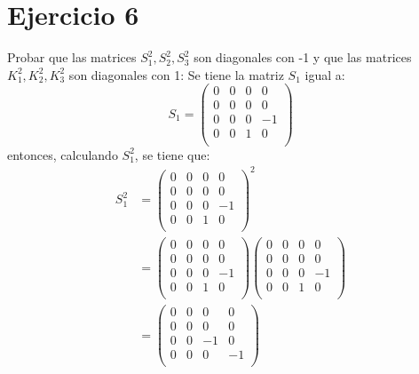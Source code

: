 \section*{Ejercicio 6}
Probar que las matrices $S_1^2,S_2^2,S_3^2$ son diagonales con -1 y que las matrices $K_1^2,K_2^2,K_3^2$ son diagonales con 1:
    Se tiene la matriz $S_1$ igual a:
    \begin{equation*}
        S_1 =\left( \begin{matrix}
            0 & 0 & 0 & 0 \\
            0 & 0 & 0 & 0 \\
            0 & 0 & 0 & -1 \\
            0 & 0 & 1 & 0 \\
        \end{matrix}\right)
    \end{equation*}
    entonces, calculando $S_1^2$, se tiene que:
    \begin{align*}
        S_1^2 &=\left( \begin{matrix}
            0 & 0 & 0 & 0 \\
            0 & 0 & 0 & 0 \\
            0 & 0 & 0 & -1 \\
            0 & 0 & 1 & 0 \\
        \end{matrix}\right)^2 \\
        & =\left( \begin{matrix}
            0 & 0 & 0 & 0 \\
            0 & 0 & 0 & 0 \\
            0 & 0 & 0 & -1 \\
            0 & 0 & 1 & 0 \\
        \end{matrix}\right)\left( \begin{matrix}
            0 & 0 & 0 & 0 \\
            0 & 0 & 0 & 0 \\
            0 & 0 & 0 & -1 \\
            0 & 0 & 1 & 0 \\
        \end{matrix}\right)\\
        & =\left( \begin{matrix}
            0 & 0 & 0 & 0 \\
            0 & 0 & 0 & 0 \\
            0 & 0 & -1 & 0 \\
            0 & 0 & 0 & -1 \\
        \end{matrix}\right)
    \end{align*}
